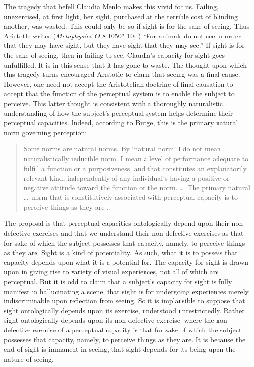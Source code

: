 \documentclass[12pt]{article}
\begin{document}
The tragedy that befell Claudia Menlo makes this vivid for us. Failing, unexercised, at first light, her sight, purchased at the terrible cost of blinding another, was wasted. This could only be so if sight is for the sake of seeing. Thus Aristotle writes (\emph{Metaphysics} \( \Theta \) 8 1050\( ^{a} \) 10; \citealt{Barnes:1984kx}) ``For animals do not see in order that they may have sight, but they have sight that they may see.'' If sight is for the sake of seeing, then in failing to see, Claudia's capacity for sight goes unfulfilled. It is in this sense that it has gone to waste. The thought upon which this tragedy turns encouraged Aristotle to claim that seeing was a final cause. However, one need not accept the Aristotelian doctrine of final causation to accept that the function of the perceptual system is to enable the subject to perceive. This latter thought is consistent with a thoroughly naturalistic understanding of how the subject's perceptual system helps determine their perceptual capacities. Indeed, according to Burge, this is the primary natural norm governing perception:
\begin{quote}
	Some norms are natural norms. By ‘natural norm’ I do not mean naturalistically reducible norm. I mean a level of performance adequate to fulfill a function or a purposiveness, and that constitutes an explanatorily relevant kind, independently of any individual’s having a positive or negative attitude toward the function or the norm. \ldots\ The primary natural \dots\ norm that is constitutively associated with perceptual capacity is to perceive things as they are \ldots\ \citep[311--312]{Burge:2010uq}
\end{quote}

The proposal is that perceptual capacities ontologically depend upon their non-defective exercises and that we understand their non-defective exercises as that for sake of which the subject possesses that capacity, namely, to perceive things as they are. Sight is a kind of potentiality. As such, what it is to possess that capacity depends upon what it is a potential for. The capacity for sight is drawn upon in giving rise to variety of visual experiences, not all of which are perceptual. But it is odd to claim that a subject's capacity for sight is fully manifest in hallucinating a scene, that sight is for undergoing experiences merely indiscriminable upon reflection from seeing. So it is implausible to suppose that sight ontologically depends upon its exercise, understood unrestrictedly. Rather sight ontologically depends upon its non-defective exercise, where the non-defective exercise of a perceptual capacity is that for sake of which the subject possesses that capacity, namely, to perceive things as they are. It is because the end of sight is immanent in seeing, that sight depends for its being upon the nature of seeing.
\end{document}
